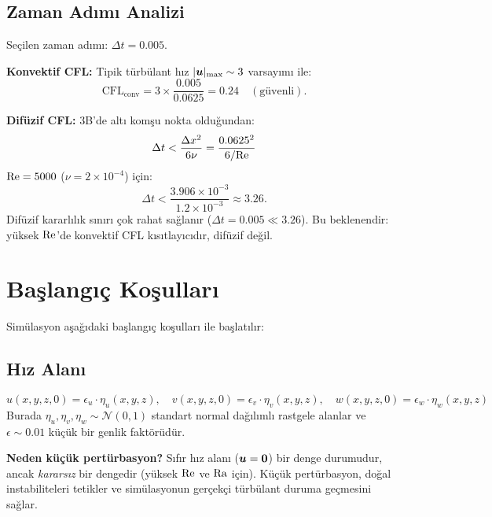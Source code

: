 \subsection{Zaman Adımı Analizi}

Seçilen zaman adımı: $\Delta t = 0.005$.

\textbf{Konvektif CFL:} Tipik türbülant hız $|\bm{u}|_{\max} \sim 3$ varsayımı ile:
\begin{equation}
    \mathrm{CFL}_{\text{conv}} = 3 \times \frac{0.005}{0.0625} = 0.24 \quad (\text{güvenli}).
    \label{eq:cfl_check}
\end{equation}

\textbf{Difüzif CFL:} 3B'de altı komşu nokta olduğundan:
\begin{equation}
    \Delta t < \frac{\Delta x^2}{6\nu} = \frac{0.0625^2}{6 / \mathrm{Re}}
    \label{eq:diffusive_cfl}
\end{equation}
$\mathrm{Re} = 5000$ ($\nu = 2 \times 10^{-4}$) için:
\[
    \Delta t < \frac{3.906 \times 10^{-3}}{1.2 \times 10^{-3}} \approx 3.26.
\]
Difüzif kararlılık sınırı çok rahat sağlanır ($\Delta t = 0.005 \ll 3.26$). Bu beklenendir: yüksek $\mathrm{Re}$'de konvektif CFL kısıtlayıcıdır, difüzif değil.


\section{Başlangıç Koşulları}
\label{sec:baslangic}

Simülasyon aşağıdaki başlangıç koşulları ile başlatılır:

\subsection{Hız Alanı}
\begin{equation}
    u(x, y, z, 0) = \epsilon_u \cdot \eta_u(x, y, z), \quad
    v(x, y, z, 0) = \epsilon_v \cdot \eta_v(x, y, z), \quad
    w(x, y, z, 0) = \epsilon_w \cdot \eta_w(x, y, z)
    \label{eq:ic_velocity}
\end{equation}
Burada $\eta_u, \eta_v, \eta_w \sim \mathcal{N}(0, 1)$ standart normal dağılımlı rastgele alanlar ve $\epsilon \sim 0.01$ küçük bir genlik faktörüdür.

\textbf{Neden küçük pertürbasyon?} Sıfır hız alanı ($\bm{u} = \bm{0}$) bir denge durumudur, ancak \textit{kararsız} bir dengedir (yüksek $\mathrm{Re}$ ve $\mathrm{Ra}$ için). Küçük pertürbasyon, doğal instabiliteleri tetikler ve simülasyonun gerçekçi türbülant duruma geçmesini sağlar.

